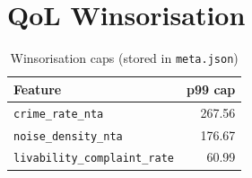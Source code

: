 \documentclass[11pt, a4paper, twoside]{report}
\begin{document}
\section{QoL Winsorisation}
\begin{table}[H]
  \centering
  \caption{Winsorisation caps (stored in \texttt{meta.json})}
  \begin{tabular}{lr}
    \toprule
    Feature & p99 cap \\
    \midrule
    \texttt{crime\_rate\_nta}           & 267.56 \\
    \texttt{noise\_density\_nta}        & 176.67 \\
    \texttt{livability\_complaint\_rate}& 60.99 \\
    \bottomrule
  \end{tabular}
\end{table}
\end{document}

